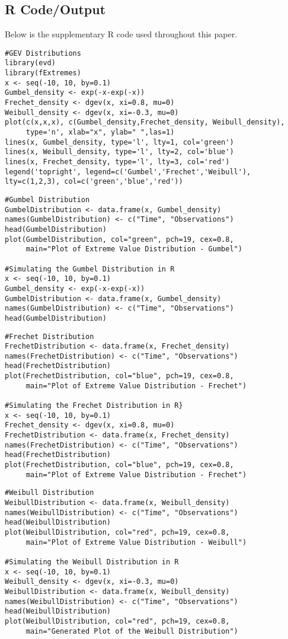 \documentclass[11pt,a4paper]{article}
\theoremstyle{plain}
\begin{document}
\newpage
\subsection{R Code/Output}
Below is the supplementary R code used throughout this paper.
\begin{verbatim}
#GEV Distributions
library(evd)
library(fExtremes)
x <- seq(-10, 10, by=0.1)
Gumbel_density <- exp(-x-exp(-x))
Frechet_density <- dgev(x, xi=0.8, mu=0)
Weibull_density <- dgev(x, xi=-0.3, mu=0)
plot(c(x,x,x), c(Gumbel_density,Frechet_density, Weibull_density),
     type='n', xlab="x", ylab=" ",las=1)
lines(x, Gumbel_density, type='l', lty=1, col='green')
lines(x, Weibull_density, type='l', lty=2, col='blue')
lines(x, Frechet_density, type='l', lty=3, col='red')
legend('topright', legend=c('Gumbel','Frechet','Weibull'), lty=c(1,2,3), col=c('green','blue','red'))
\end{verbatim}

\begin{verbatim}
#Gumbel Distribution
GumbelDistribution <- data.frame(x, Gumbel_density)
names(GumbelDistribution) <- c("Time", "Observations")
head(GumbelDistribution)
plot(GumbelDistribution, col="green", pch=19, cex=0.8,
     main="Plot of Extreme Value Distribution - Gumbel")
     
#Simulating the Gumbel Distribution in R     
x <- seq(-10, 10, by=0.1)
Gumbel_density <- exp(-x-exp(-x))
GumbelDistribution <- data.frame(x, Gumbel_density)
names(GumbelDistribution) <- c("Time", "Observations")
head(GumbelDistribution)
\end{verbatim}

\begin{verbatim}
#Frechet Distribution
FrechetDistribution <- data.frame(x, Frechet_density)
names(FrechetDistribution) <- c("Time", "Observations")
head(FrechetDistribution)
plot(FrechetDistribution, col="blue", pch=19, cex=0.8,
     main="Plot of Extreme Value Distribution - Frechet")
     
#Simulating the Frechet Distribution in R} 
x <- seq(-10, 10, by=0.1)
Frechet_density <- dgev(x, xi=0.8, mu=0)
FrechetDistribution <- data.frame(x, Frechet_density)
names(FrechetDistribution) <- c("Time", "Observations")
head(FrechetDistribution)
plot(FrechetDistribution, col="blue", pch=19, cex=0.8,
     main="Plot of Extreme Value Distribution - Frechet")
\end{verbatim}

\begin{verbatim}
#Weibull Distribution   
WeibullDistribution <- data.frame(x, Weibull_density)
names(WeibullDistribution) <- c("Time", "Observations")
head(WeibullDistribution)
plot(WeibullDistribution, col="red", pch=19, cex=0.8,
     main="Plot of Extreme Value Distribution - Weibull")
     
#Simulating the Weibull Distribution in R
x <- seq(-10, 10, by=0.1)
Weibull_density <- dgev(x, xi=-0.3, mu=0)
WeibullDistribution <- data.frame(x, Weibull_density)
names(WeibullDistribution) <- c("Time", "Observations")
head(WeibullDistribution)
plot(WeibullDistribution, col="red", pch=19, cex=0.8,
     main="Generated Plot of the Weibull Distribution")
\end{verbatim}
\end{document}
